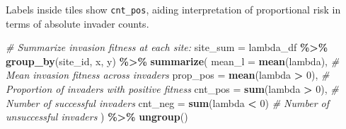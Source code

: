 \documentclass[
]{article}
\newenvironment{Shaded}{\begin{snugshade}}{\end{snugshade}}
\newcommand{\AttributeTok}[1]{\textcolor[rgb]{0.13,0.29,0.53}{#1}}
\newcommand{\CommentTok}[1]{\textcolor[rgb]{0.56,0.35,0.01}{\textit{#1}}}
\newcommand{\DecValTok}[1]{\textcolor[rgb]{0.00,0.00,0.81}{#1}}
\newcommand{\FunctionTok}[1]{\textcolor[rgb]{0.13,0.29,0.53}{\textbf{#1}}}
\newcommand{\NormalTok}[1]{#1}
\newcommand{\OtherTok}[1]{\textcolor[rgb]{0.56,0.35,0.01}{#1}}
\newcommand{\SpecialCharTok}[1]{\textcolor[rgb]{0.81,0.36,0.00}{\textbf{#1}}}
\begin{document}
Labels inside tiles show \texttt{cnt\_pos}, aiding interpretation of
proportional risk in terms of absolute invader counts.

\begin{Shaded}
\begin{Highlighting}[]
\CommentTok{\# Summarize invasion fitness at each site:}
\NormalTok{site\_sum }\OtherTok{=}\NormalTok{ lambda\_df }\SpecialCharTok{\%\textgreater{}\%}
  \FunctionTok{group\_by}\NormalTok{(site\_id, x, y) }\SpecialCharTok{\%\textgreater{}\%}
  \FunctionTok{summarize}\NormalTok{(}
    \AttributeTok{mean\_l   =} \FunctionTok{mean}\NormalTok{(lambda),             }\CommentTok{\# Mean invasion fitness across invaders}
    \AttributeTok{prop\_pos =} \FunctionTok{mean}\NormalTok{(lambda }\SpecialCharTok{\textgreater{}} \DecValTok{0}\NormalTok{),         }\CommentTok{\# Proportion of invaders with positive fitness}
    \AttributeTok{cnt\_pos  =} \FunctionTok{sum}\NormalTok{(lambda }\SpecialCharTok{\textgreater{}} \DecValTok{0}\NormalTok{),          }\CommentTok{\# Number of successful invaders}
    \AttributeTok{cnt\_neg  =} \FunctionTok{sum}\NormalTok{(lambda }\SpecialCharTok{\textless{}} \DecValTok{0}\NormalTok{)           }\CommentTok{\# Number of unsuccessful invaders}
\NormalTok{  ) }\SpecialCharTok{\%\textgreater{}\%}
  \FunctionTok{ungroup}\NormalTok{()}


\end{Highlighting}
\end{Shaded}
\end{document}
